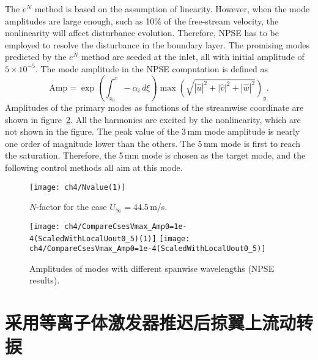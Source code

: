 The $e^{N}$ method is based on the assumption of linearity. However, when the mode amplitudes are large enough, such as 10\% of the free-stream velocity, the nonlinearity will affect  disturbance evolution. Therefore, NPSE has to be employed to resolve the disturbance in the boundary layer. The promising modes predicted by the $e^{N}$ method are seeded at the inlet, all with initial amplitude of $5\times10^{-5}$. The mode amplitude in the NPSE computation is defined as
\begin{equation}
\mathrm{Amp}=\exp\!\left(\int_{x_0}^x -\alpha _i\,d\xi\right)\max\!\left(\sqrt{\left| \hat{u} \right|^2+\left| \hat{v} \right|^2+\left| \hat{w} \right|^2}\right)_y.
\end{equation}
Amplitudes of the primary modes as functions of the streamwise coordinate are shown in figure~\ref{f:NPSE}. All the harmonics are excited by the nonlinearity, which are not shown in the figure. The peak value of the 3\,mm mode amplitude is nearly one order of magnitude lower than the others. The 5\,mm mode is first to reach the saturation. Therefore, the 5\,mm mode is chosen as the target mode, and the following control methods  all aim at this mode.
\begin{figure}
\centering
  \texttt{[image: ch4/Nvalue(1)]}
  \caption{$N$-factor for the case $U_\infty= 44.5$\,m/s.}%
  \label{fig:Nfactor445}
\end{figure}
\begin{figure}
\centering
  \texttt{[image: ch4/CompareCsesVmax\_Amp0=1e-4(ScaledWithLocalUout0\_5)(1)]} \texttt{[image: ch4/CompareCsesVmax\_Amp0=1e-4(ScaledWithLocalUout0\_5)]}
  \caption{Amplitudes of modes with different spanwise wavelengths (NPSE results).}\label{f:NPSE}%
\end{figure}


\section{采用等离子体激发器推迟后掠翼上流动转捩}


